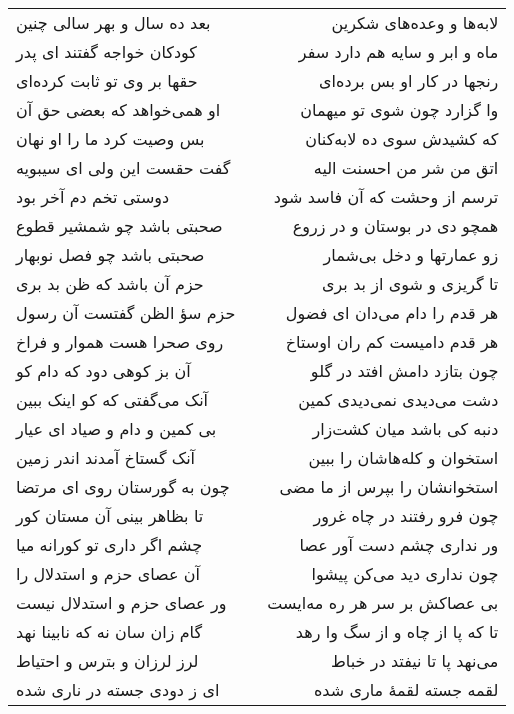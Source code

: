 \begin{center}
\begin{longtable}{l p{0.5cm} r}
بعد ده سال و بهر سالی چنین
&&
لابه‌ها و وعده‌های شکرین
\\
کودکان خواجه گفتند ای پدر
&&
ماه و ابر و سایه هم دارد سفر
\\
حقها بر وی تو ثابت کرده‌ای
&&
رنجها در کار او بس برده‌ای
\\
او همی‌خواهد که بعضی حق آن
&&
وا گزارد چون شوی تو میهمان
\\
بس وصیت کرد ما را او نهان
&&
که کشیدش سوی ده لابه‌کنان
\\
گفت حقست این ولی ای سیبویه
&&
اتق من شر من احسنت الیه
\\
دوستی تخم دم آخر بود
&&
ترسم از وحشت که آن فاسد شود
\\
صحبتی باشد چو شمشیر قطوع
&&
همچو دی در بوستان و در زروع
\\
صحبتی باشد چو فصل نوبهار
&&
زو عمارتها و دخل بی‌شمار
\\
حزم آن باشد که ظن بد بری
&&
تا گریزی و شوی از بد بری
\\
حزم سؤ الظن گفتست آن رسول
&&
هر قدم را دام می‌دان ای فضول
\\
روی صحرا هست هموار و فراخ
&&
هر قدم دامیست کم ران اوستاخ
\\
آن بز کوهی دود که دام کو
&&
چون بتازد دامش افتد در گلو
\\
آنک می‌گفتی که کو اینک ببین
&&
دشت می‌دیدی نمی‌دیدی کمین
\\
بی کمین و دام و صیاد ای عیار
&&
دنبه کی باشد میان کشت‌زار
\\
آنک گستاخ آمدند اندر زمین
&&
استخوان و کله‌هاشان را ببین
\\
چون به گورستان روی ای مرتضا
&&
استخوانشان را بپرس از ما مضی
\\
تا بظاهر بینی آن مستان کور
&&
چون فرو رفتند در چاه غرور
\\
چشم اگر داری تو کورانه میا
&&
ور نداری چشم دست آور عصا
\\
آن عصای حزم و استدلال را
&&
چون نداری دید می‌کن پیشوا
\\
ور عصای حزم و استدلال نیست
&&
بی عصاکش بر سر هر ره مه‌ایست
\\
گام زان سان نه که نابینا نهد
&&
تا که پا از چاه و از سگ وا رهد
\\
لرز لرزان و بترس و احتیاط
&&
می‌نهد پا تا نیفتد در خباط
\\
ای ز دودی جسته در ناری شده
&&
لقمه جسته لقمهٔ ماری شده
\\
\end{longtable}
\end{center}
